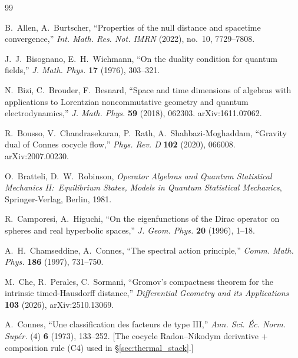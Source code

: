 \documentclass[11pt,a4paper]{article}
\theoremstyle{plain}
\theoremstyle{definition}
\begin{document}
\begin{thebibliography}{99}

B.~Allen, A.~Burtscher, ``Properties of the null distance and
spacetime convergence,'' \emph{Int. Math. Res. Not. IMRN} (2022),
no.~10, 7729--7808.

J.~J.~Bisognano, E.~H.~Wichmann, ``On the duality condition for
quantum fields,'' \emph{J. Math. Phys.} \textbf{17} (1976), 303--321.

N.~Bizi, C.~Brouder, F.~Besnard, ``Space and time dimensions of
algebras with applications to Lorentzian noncommutative geometry and
quantum electrodynamics,'' \emph{J. Math. Phys.} \textbf{59} (2018),
062303. arXiv:1611.07062.

R.~Bousso, V.~Chandrasekaran, P.~Rath, A.~Shahbazi-Moghaddam,
``Gravity dual of Connes cocycle flow,'' \emph{Phys. Rev. D} \textbf{102}
(2020), 066008. arXiv:2007.00230.

O.~Bratteli, D.~W.~Robinson, \emph{Operator Algebras and Quantum
Statistical Mechanics II:\ Equilibrium States, Models in Quantum
Statistical Mechanics}, Springer-Verlag, Berlin, 1981.

R.~Camporesi, A.~Higuchi, ``On the eigenfunctions of the Dirac
operator on spheres and real hyperbolic spaces,''
\emph{J. Geom. Phys.} \textbf{20} (1996), 1--18.

A.~H.~Chamseddine, A.~Connes, ``The spectral action principle,''
\emph{Comm. Math. Phys.} \textbf{186} (1997), 731--750.

M.~Che, R.~Perales, C.~Sormani,
``Gromov's compactness theorem for the intrinsic timed-Hausdorff distance,''
\emph{Differential Geometry and its Applications} \textbf{103} (2026), arXiv:2510.13069.

A.~Connes, ``Une classification des facteurs de type III,''
\emph{Ann. Sci. \'Ec. Norm. Sup\'er.} (4) \textbf{6} (1973), 133--252.
[The cocycle Radon--Nikodym derivative + composition rule (C4) used
in \S\ref{sec:thermal_stack}.]


\end{thebibliography}
\end{document}
